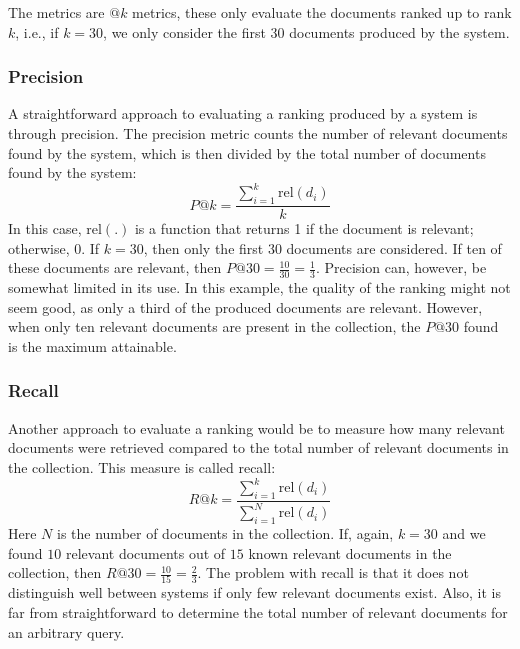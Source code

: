The metrics are $@k$ metrics, these only evaluate the documents ranked up to rank $k$, i.e., if $k=30$, we only consider the first $30$ documents produced by the system.

\subsubsection{Precision}
A straightforward approach to evaluating a ranking produced by a system is through precision. The precision metric counts the number of relevant documents found by the system, which is then divided by the total number of documents found by the system:
\begin{equation}
	\textit{P}@k = \frac{\sum_{i=1}^k\text{rel}\left(d_i\right)}{k}
\end{equation}
In this case, $\text{rel}(.)$ is a function that returns 1 if the document is relevant; otherwise, 0.
If $k=30$, then only the first $30$ documents are considered. If ten of these documents are relevant, then $P@30 = \frac{10}{30} = \frac{1}{3}$. Precision can, however, be somewhat limited in its use. In this example, the quality of the ranking might not seem good, as only a third of the produced documents are relevant. However, when only ten relevant documents are present in the collection, the $P@30$ found is the maximum attainable.  

\subsubsection{Recall}
Another approach to evaluate a ranking would be to measure how many relevant documents were retrieved compared to the total number of relevant documents in the collection. This measure is called recall: 
\begin{equation}
	\textit{R}@k = \frac{\sum_{i=1}^k\text{rel}\left(d_i\right)}{\sum_{i=1}^N\text{rel}\left(d_i\right)}
\end{equation}
Here $N$ is the number of documents in the collection. If, again, $k=30$ and we found $10$ relevant documents out of $15$ known relevant documents in the collection, then $R@30 = \frac{10}{15} = \frac{2}{3}$. The problem with recall is that it does not distinguish well between systems if only few relevant documents exist. Also, it is far from straightforward to determine the total number of relevant documents for an arbitrary query.

